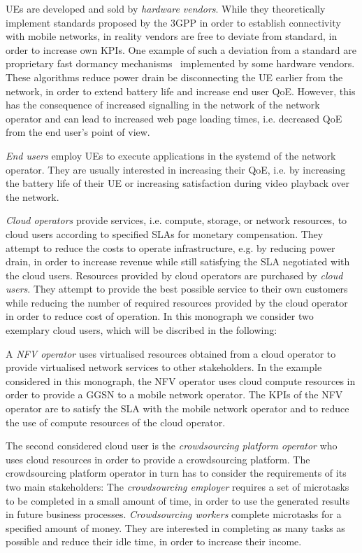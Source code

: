 
\glspl{UE} are developed and sold by \emph{hardware vendors}.
While they theoretically implement standards proposed by the \gls{3GPP} in order to establish connectivity with mobile networks, in reality vendors are free to deviate from standard, in order to increase own \glspl{KPI}.
One example of such a deviation from a standard are proprietary fast dormancy mechanisms~\cite{GSM2010} implemented by some hardware vendors.
These algorithms reduce power drain be disconnecting the \gls{UE} earlier from the network, in order to extend battery life and increase end user \gls{QoE}.
However, this has the consequence of increased signalling in the network of the network operator and can lead to increased web page loading times, i.e. decreased \gls{QoE} from the end user's point of view.

\emph{End users} employ \glspl{UE} to execute applications in the systemd of the network operator. 
They are usually interested in increasing their \gls{QoE}, i.e. by increasing the battery life of their \gls{UE} or increasing satisfaction during video playback over the network.

\emph{Cloud operators} provide services, i.e. compute, storage, or network resources, to cloud users according to specified \glspl{SLA} for monetary compensation. 
They attempt to reduce the costs to operate infrastructure, e.g. by reducing power drain, in order to increase revenue while still satisfying the \gls{SLA} negotiated with the cloud users.
Resources provided by cloud operators are purchased by \emph{cloud users}.
They attempt to provide the best possible service to their own customers while reducing the number of required resources provided by the cloud operator in order to reduce cost of operation. In this monograph we consider two exemplary cloud users, which will be discribed in the following:

A \emph{\gls{NFV} operator} uses virtualised resources obtained from a cloud operator to provide virtualised network services to other stakeholders.
In the example considered in this monograph, the \gls{NFV} operator uses cloud compute resources in order to provide a \gls{GGSN} to a mobile network operator.
The \glspl{KPI} of the \gls{NFV} operator are to satisfy the \gls{SLA} with the mobile network operator and to reduce the use of compute resources of the cloud operator.

The second considered cloud user is the \emph{crowdsourcing platform operator} who uses cloud resources in order to provide a crowdsourcing platform.
The crowdsourcing platform operator in turn has to consider the requirements of its two main stakeholders:
The \emph{crowdsourcing employer} requires a set of microtasks to be completed in a small amount of time, in order to use the generated results in future business processes. 
\emph{Crowdsourcing workers} complete microtasks for a specified amount of money.
They are interested in completing as many tasks as possible and reduce their idle time, in order to increase their income.

